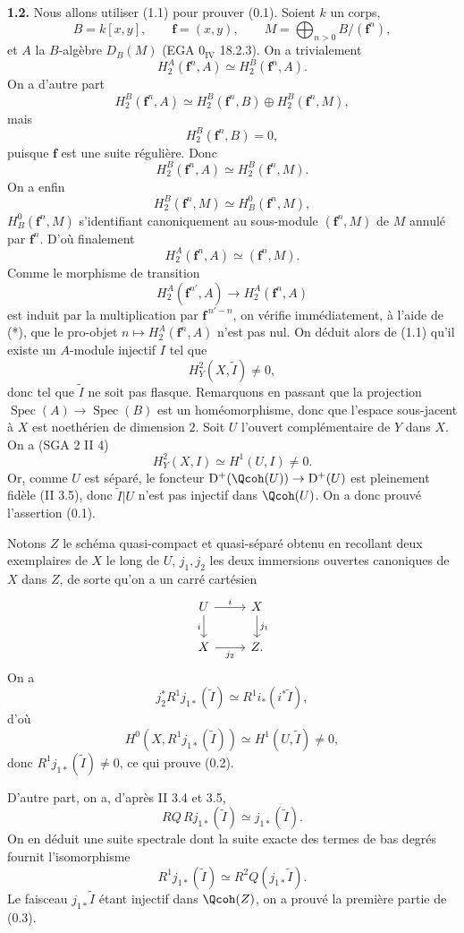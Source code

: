 \documentclass[11pt]{article}
\newcommand{\Spec}{\operatorname{Spec}}
\begin{document}
\textbf{1.2.} Nous allons utiliser (1.1) pour prouver (0.1). Soient $k$ un corps,
\[
 B=k[x,y],\qquad \mathbf f=(x,y),\qquad
 M=\bigoplus_{n>0}B/(\mathbf f^n),
\]
et $A$ la $B$-algèbre $D_B(M)$ (EGA $0_{\mathrm{IV}}$ 18.2.3). On a trivialement
\[
 H_2^A(\mathbf f^n,A)\simeq H_2^B(\mathbf f^n,A).
\]
On a d'autre part
\[
 H_2^B(\mathbf f^n,A)\simeq H_2^B(\mathbf f^n,B)\oplus H_2^B(\mathbf f^n,M),
\]
mais
\[
 H_2^B(\mathbf f^n,B)=0,
\]
puisque $\mathbf f$ est une suite régulière. Donc
\[
 H_2^B(\mathbf f^n,A)\simeq H_2^B(\mathbf f^n,M).
\]
On a enfin
\[
 H_2^B(\mathbf f^n,M)\simeq H_B^0(\mathbf f^n,M),
\]
$H_B^0(\mathbf f^n,M)$ s'identifiant canoniquement au sous-module $(\mathbf f^n,M)$ de $M$ annulé par $\mathbf f^n$. D'où finalement
\begin{equation}\tag{*}
 H_2^A(\mathbf f^n,A)\simeq (\mathbf f^n,M).
\end{equation}
Comme le morphisme de transition
\[
 H_2^A(\mathbf f^{n'},A)\longrightarrow H_2^A(\mathbf f^n,A)
\]
est induit par la multiplication par $\mathbf f^{\,n'-n}$, on vérifie immédiatement, à l'aide de (*), que le pro-objet $n\mapsto H_2^A(\mathbf f^n,A)$ n'est pas nul. On déduit alors de (1.1) qu'il existe un $A$-module injectif $I$ tel que
\[
 H^2_Y(X,\widetilde I)\ne0,
\]
donc tel que $\widetilde I$ ne soit pas flasque. Remarquons en passant que la projection $\Spec(A)\to\Spec(B)$ est un homéomorphisme, donc que l'espace sous-jacent à $X$ est noethérien de dimension $2$. Soit $U$ l'ouvert complémentaire de $Y$ dans $X$. On a (SGA 2 II 4)
\[
 H^2_Y(X,I)\simeq H^1(U,I)\ne0.
\]
Or, comme $U$ est séparé, le foncteur $\mathrm D^+(\Qcoh(U))\to\mathrm D^+(U)$ est pleinement fidèle (II 3.5), donc $\widetilde I|U$ n'est pas injectif dans $\Qcoh(U)$. On a donc prouvé l'assertion (0.1).

Notons $Z$ le schéma quasi-compact et quasi-séparé obtenu en recollant deux exemplaires de $X$ le long de $U$, $j_1,j_2$ les deux immersions ouvertes canoniques de $X$ dans $Z$, de sorte qu'on a un carré cartésien
\[
\begin{tikzcd}
 U \arrow[r,"i"] \arrow[d,"i"'] & X \arrow[d,"j_1"]\\
 X \arrow[r,"j_2"'] & Z .
\end{tikzcd}
\]
On a
\[
 j_2^*R^1j_{1*}(\widetilde I)\simeq R^1i_*(i^*\widetilde I),
\]
d'où
\[
 H^0(X,R^1j_{1*}(\widetilde I))\simeq H^1(U,\widetilde I)\ne0,
\]
donc $R^1j_{1*}(\widetilde I)\ne0$, ce qui prouve (0.2).

D'autre part, on a, d'après II 3.4 et 3.5,
\[
 RQ\,Rj_{1*}(\widetilde I)\simeq j_{1*}(\widetilde I).
\]
On en déduit une suite spectrale dont la suite exacte des termes de bas degrés fournit l'isomorphisme
\[
 R^1j_{1*}(\widetilde I)\simeq R^2Q(j_{1*}\widetilde I).
\]
Le faisceau $j_{1*}\widetilde I$ étant injectif dans $\Qcoh(Z)$, on a prouvé la première partie de (0.3).
\end{document}

